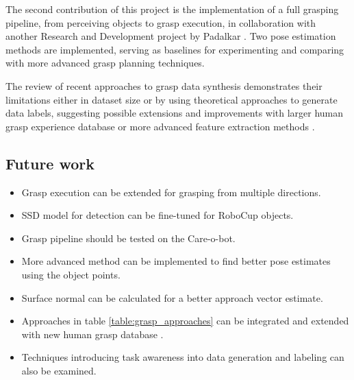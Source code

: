\documentclass[runningheads]{../llncs}
\begin{document}
The second contribution of this project is the implementation of a full grasping pipeline, from perceiving objects to
grasp execution, in collaboration with another Research and Development project by Padalkar \cite{Padalkar2018}. Two
pose estimation methods are implemented, serving as baselines for experimenting and comparing with more advanced grasp
planning techniques.

The review of recent approaches to grasp data synthesis demonstrates their limitations either in dataset size or by
using theoretical approaches to generate data labels, suggesting possible extensions and improvements with larger human
grasp experience database \cite{Saudabayev2018} or more advanced feature extraction methods \cite{Varley2017}.

\subsection{Future work}

\begin{itemize}
    \item Grasp execution can be extended for grasping from multiple directions.
    \item SSD model for detection can be fine-tuned for RoboCup objects.
    \item Grasp pipeline should be tested on the Care-o-bot.
    \item More advanced method can be implemented to find better pose estimates using the object points.
    \item Surface normal can be calculated for a better approach vector estimate.
    \item Approaches in table \ref{table:grasp_approaches} can be integrated and extended with new human grasp
    database \cite{Saudabayev2018}.
    \item Techniques introducing task awareness into data generation and labeling can also be examined.
\end{itemize}

%


%
\end{document}
